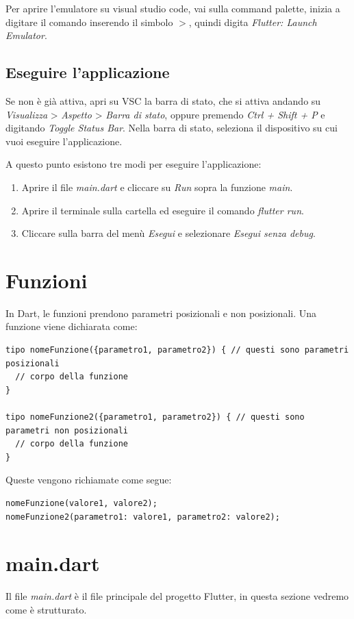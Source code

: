 \documentclass[12pt]{article}
\begin{document}
Per aprire l'emulatore su visual studio code,
vai sulla command palette, inizia a digitare il comando inserendo il simbolo
$>$, quindi digita \textit{Flutter: Launch Emulator}.

\subsection{Eseguire l'applicazione}
Se non è già attiva, apri su VSC la barra di stato, che
si attiva andando su \textit{Visualizza} > \textit{Aspetto} > \textit{Barra di stato},
oppure premendo \textit{Ctrl + Shift + P} e digitando \textit{Toggle Status Bar}.
Nella barra di stato, seleziona il dispositivo su cui vuoi
eseguire l'applicazione.

A questo punto esistono tre modi per eseguire l'applicazione:
\begin{enumerate}
    \item Aprire il file \textit{main.dart} e cliccare su \textit{Run} sopra
    la funzione \textit{main}.
    \item Aprire il terminale sulla cartella ed eseguire il comando
    \textit{flutter run}.
    \item Cliccare sulla barra del menù \textit{Esegui} e selezionare
    \textit{Esegui senza debug}.
\end{enumerate}

\section{Funzioni}
In Dart, le funzioni prendono
parametri posizionali e non posizionali. Una funzione
viene dichiarata come:
\begin{verbatim}
tipo nomeFunzione({parametro1, parametro2}) { // questi sono parametri posizionali
  // corpo della funzione
}

tipo nomeFunzione2({parametro1, parametro2}) { // questi sono parametri non posizionali
  // corpo della funzione
}
\end{verbatim}

Queste vengono richiamate come segue:
\begin{verbatim}
nomeFunzione(valore1, valore2);
nomeFunzione2(parametro1: valore1, parametro2: valore2);
\end{verbatim}


\section{main.dart}
Il file \textit{main.dart} è il file principale del progetto
Flutter, in questa sezione vedremo come è strutturato.
\end{document}
